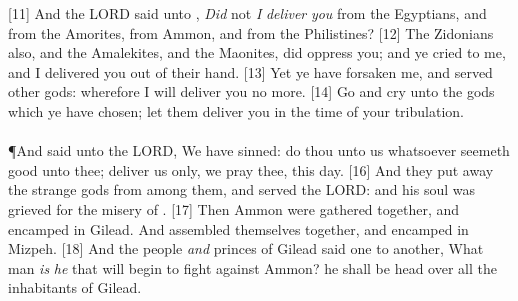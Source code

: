 [11] \textcolor[cmyk]{0.99998,1,0,0}{And the LORD said unto  , \emph{Did} not \emph{I} \emph{deliver} \emph{you} from the Egyptians, and from the Amorites, from  Ammon, and from the Philistines?}
[12] \textcolor[cmyk]{0.99998,1,0,0}{The Zidonians also, and the Amalekites, and the Maonites, did oppress you; and ye cried to me, and I delivered you out of their hand.}
[13] \textcolor[cmyk]{0.99998,1,0,0}{Yet ye have forsaken me, and served other gods: wherefore I will deliver you no more.}
[14] \textcolor[cmyk]{0.99998,1,0,0}{Go and cry unto the gods which ye have chosen; let them deliver you in the time of your tribulation.}\\
\\
\P \textcolor[cmyk]{0.99998,1,0,0}{And   said unto the LORD, We have sinned: do thou unto us whatsoever seemeth good unto thee; deliver us only, we pray thee, this day.}
[16] \textcolor[cmyk]{0.99998,1,0,0}{And they put away the strange gods from among them, and served the LORD: and his soul was grieved for the misery of .}
[17] \textcolor[cmyk]{0.99998,1,0,0}{Then  Ammon were gathered together, and encamped in Gilead. And   assembled themselves together, and encamped in Mizpeh.}
[18] \textcolor[cmyk]{0.99998,1,0,0}{And the people \emph{and} princes of Gilead said one to another, What man \emph{is} \emph{he} that will begin to fight against  Ammon? he shall be head over all the inhabitants of Gilead.}